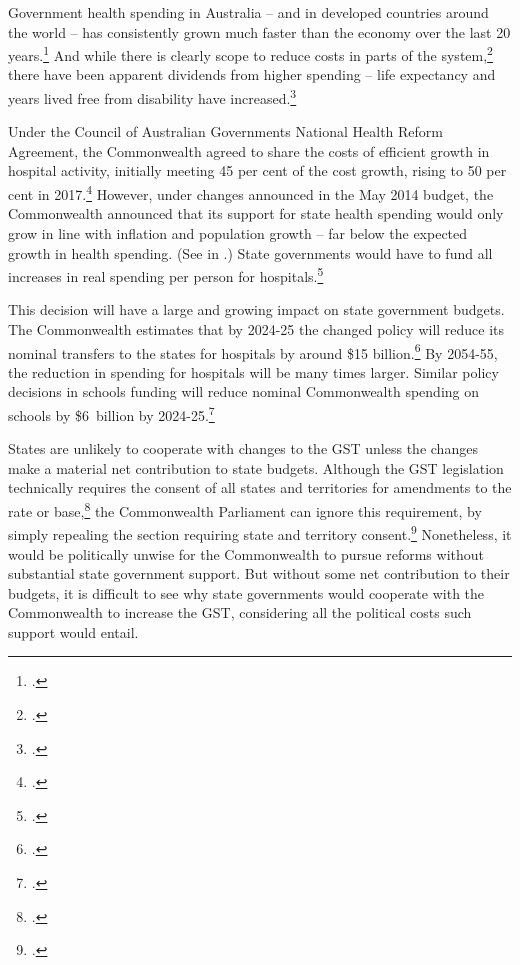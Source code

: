 Government health spending in Australia – and in developed countries around the world – has consistently grown much faster than the economy over the last 20 years.\footcites[][25--27]{DaleyWoodWeidmannEtAl2014}[][17]{DaleyMcGannonHunter2014}  And while there is clearly scope to reduce costs in parts of the system,\footcites{DuckettBreadonGinnivanEtAl2013}{DuckettBreadonRomanesEtAl2015}  there have been apparent dividends from higher spending – life expectancy and years lived free from disability have increased.\footcite[][16]{Daley2015}  

Under the Council of Australian Governments National Health Reform Agreement, the Commonwealth agreed to share the costs of efficient growth in hospital activity, initially meeting 45 per cent of the cost growth, rising to 50 per cent in 2017.\footcite[][13]{COAG2011}  However, under changes announced in the May 2014 budget, the Commonwealth announced that its support for state health spending would only grow in line with inflation and population growth – far below the expected growth in health spending. (See  in \@.)  State governments would have to fund all increases in real spending per person for hospitals.\footcite[][Budget Paper No.~2, p.~126]{Treasury2014-Budget-Papers-2014-15}  

This decision will have a large and growing impact on state government budgets. The Commonwealth estimates that by 2024-25 the changed policy will reduce its nominal transfers to the states for hospitals by around \$15 billion.\footcite[][115]{SenateEconomicsLegislationCommittee2014}  By 2054-55, the reduction in spending for hospitals will be many times larger.  Similar policy decisions in schools funding will reduce nominal Commonwealth spending on schools by \$6~billion by 2024-25.\footcite[][115]{SenateEconomicsLegislationCommittee2014}

States are unlikely to cooperate with changes to the GST unless the changes make a material net contribution to state budgets. Although the GST legislation technically requires the consent of all states and territories for amendments to the rate or base,\footcite[][\S11]{GST-Act-Rate-Base-1999}  the Commonwealth Parliament can ignore this requirement, by simply repealing the section requiring state and territory consent.\footcite{Twomey2003}  Nonetheless, it would be politically unwise for the Commonwealth to pursue reforms without substantial state government support. But without some net contribution to their budgets, it is difficult to see why state governments would cooperate with the Commonwealth to increase the GST, considering all the political costs such support would entail. 

